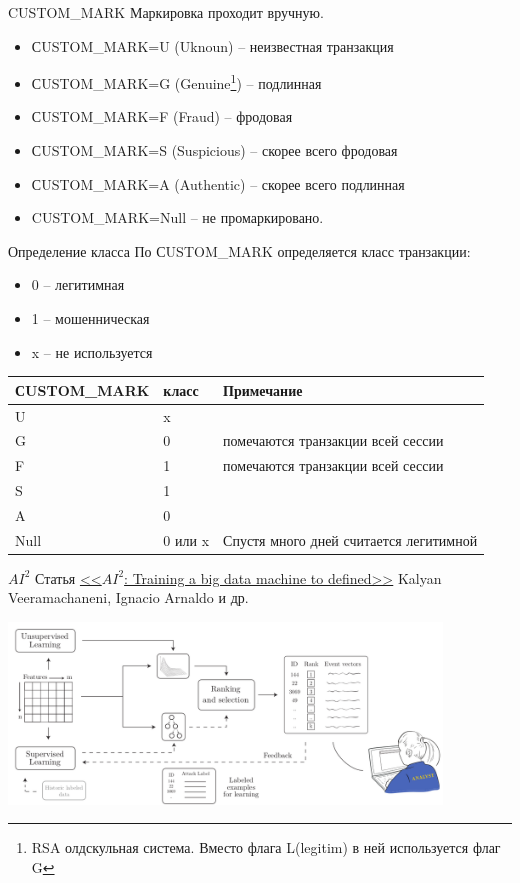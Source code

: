 \begin{frame}{CUSTOM\_MARK}\label{frame:custom_mark}
	Маркировка проходит вручную.
	\begin{itemize}
		\item СUSTOM\_MARK=U (Uknoun) – неизвестная транзакция
		\item СUSTOM\_MARK=G (Genuine\footnote{RSA олдскульная система. Вместо флага L(legitim) в ней используется флаг G}) – подлинная
		\item СUSTOM\_MARK=F (Fraud) – фродовая
		\item СUSTOM\_MARK=S (Suspicious) – скорее всего фродовая
		\item СUSTOM\_MARK=A (Authentic) – скорее всего подлинная
		\item CUSTOM\_MARK=Null – не промаркировано.
	\end{itemize}
\end{frame}


\begin{frame}{Определение класса}
	По  СUSTOM\_MARK определяется класс транзакции:
	\begin{itemize}
		\item 0 -- легитимная
		\item 1 -- мошенническая
		\item x -- не используется
	\end{itemize}
	
	\begin{tabular}{|l|l|l|}
		\hline
		СUSTOM\_MARK & класс & Примечание \\ \hline
		U & x & \\ \hline
		G & 0 & \small помечаются транзакции всей сессии\\ \hline
		F & 1 & \small помечаются транзакции всей сессии\\ \hline
		S & 1 & \\ \hline
		A & 0 & \\ \hline
		Null & 0 или x & \footnotesize Спустя много дней считается легитимной\\ \hline
	\end{tabular}
\end{frame}

\begin{frame}{$AI^2$}
	Статья \textcolor{blue}{\href{https://yadi.sk/i/dJ-SrV4y3JFSPV}{<<$AI^2$: Training a big data machine to defined>>}} Kalyan Veeramachaneni, Ignacio Arnaldo и др.
	
		\includegraphics[width=11.5cm]{../pic/ai2_first.png}	
\end{frame}


